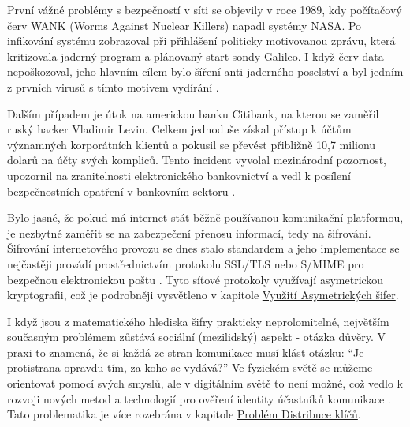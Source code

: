 První vážné problémy s bezpečností v síti se objevily v roce 1989, kdy počítačový červ WANK (Worms Against Nuclear Killers) napadl systémy NASA. Po infikování systému zobrazoval při přihlášení politicky motivovanou zprávu, která kritizovala jaderný program a plánovaný start sondy Galileo. I když červ data nepoškozoval, jeho hlavním cílem bylo šíření anti-jaderného poselství a byl jedním z prvních virusů s tímto motivem vydírání \parencite{erben2014}.

Dalším případem je útok na americkou banku Citibank, na kterou se zaměřil ruský hacker Vladimir Levin. Celkem jednoduše získal přístup k účtům významných korporátních klientů a pokusil se převést přibližně 10,7 milionu dolarů na účty svých kompliců. Tento incident vyvolal mezinárodní pozornost, upozornil na zranitelnosti elektronického bankovnictví a vedl k posílení bezpečnostních opatření v bankovním sektoru \parencite{erben2014}.

Bylo jasné, že pokud má internet stát běžně používanou komunikační platformou, je nezbytné zaměřit se na zabezpečení přenosu informací, tedy na šifrování. Šifrování internetového provozu se dnes stalo standardem a jeho implementace se nejčastěji provádí prostřednictvím protokolu SSL/TLS nebo S/MIME pro bezpečnou elektronickou poštu \parencite{pavlicek2012}. Tyto síťové protokoly využívají asymetrickou kryptografii, což je podrobněji vysvětleno v kapitole \hyperref[sec:asymetricka-kryptografie]{Využití Asymetrických šifer}.

I když jsou z matematického hlediska šifry prakticky neprolomitelné, největším současným problémem zůstává sociální (mezilidský) aspekt - otázka důvěry. V praxi to znamená, že si každá ze stran komunikace musí klást otázku: \enquote{Je protistrana opravdu tím, za koho se vydává?} Ve fyzickém světě se můžeme orientovat pomocí svých smyslů, ale v digitálním světě to není možné, což vedlo k rozvoji nových metod a technologií pro ověření identity účastníků komunikace \parencite{burda2019}. Tato problematika je více rozebrána v kapitole \hyperref[sec:distribuce-klicu]{Problém Distribuce klíčů}.

\newpage